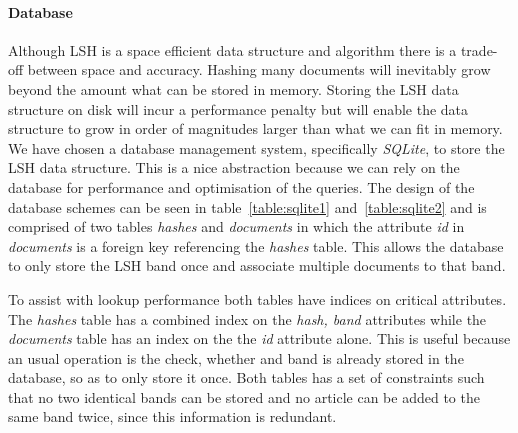 \paragraph{Database}
Although LSH is a space efficient data structure and algorithm there is a trade-off between space and accuracy. Hashing many documents will inevitably grow beyond the amount what can be stored in memory. Storing the LSH data structure on disk will incur a performance penalty but will enable the data structure to grow in order of magnitudes larger than what we can fit in memory. We have chosen a database management system, specifically \emph{SQLite}, to store the LSH data structure. This is a nice abstraction because we can rely on the database for performance and optimisation of the queries. The design of the database schemes can be seen in table~\ref{table:sqlite1} and~\ref{table:sqlite2} and is comprised of two tables \emph{hashes} and \emph{documents} in which the attribute \emph{id} in \emph{documents} is a foreign key referencing the \emph{hashes} table. This allows the database to only store the LSH band once and associate multiple documents to that band.

To assist with lookup performance both tables have indices on critical attributes. The \emph{hashes} table has a combined index on the \emph{hash, band} attributes while the \emph{documents} table has an index on the the \emph{id} attribute alone. This is useful because an usual operation is the check, whether and band is already stored in the database, so as to only store it once. Both tables has a set of constraints such that no two identical bands can be stored and no article can be added to the same band twice, since this information is redundant.


